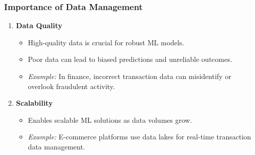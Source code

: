 \documentclass{beamer}
\begin{document}
\begin{frame}[fragile]
    \frametitle{Importance of Data Management}
    \begin{enumerate}
        \item \textbf{Data Quality}
        \begin{itemize}
            \item High-quality data is crucial for robust ML models.
            \item Poor data can lead to biased predictions and unreliable outcomes.
            \item \textit{Example:} In finance, incorrect transaction data can misidentify or overlook fraudulent activity.
        \end{itemize}
        
        \item \textbf{Scalability}
        \begin{itemize}
            \item Enables scalable ML solutions as data volumes grow.
            \item \textit{Example:} E-commerce platforms use data lakes for real-time transaction data management.
        \end{itemize}
    \end{enumerate}
\end{frame}
\end{document}
